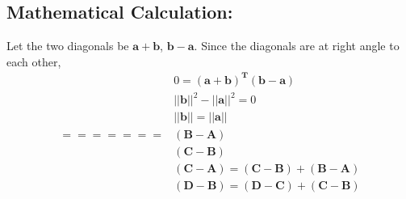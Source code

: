 \documentclass[a4paper,12pt,twocolumn]{article}
\let\vec\mathbf
\begin{document}
\subsection{Mathematical Calculation:}
Let the two diagonals be $\vec{a+b}$, $\vec{b-a}$. Since the diagonals are at right angle to each other,
\begin{align}
&0 = \vec{(a+b)^T}\vec{(b-a)}\\	
&||\vec{b}||^2 - ||\vec{a}||^2 = 0\\
&||\vec{b}|| = ||\vec{a}||\\
=======
	&\vec{(B-A)}\\
	&\vec{(C-B)}\\
	&\vec{(C-A)} = \vec{(C-B)} +\vec{(B-A)}\\
	&\vec{(D-B)} = \vec{(D-C)}+\vec{(C-B)}
\end{align}
\end{document}
